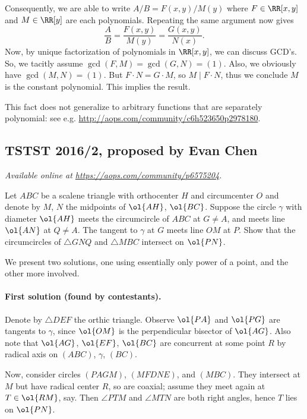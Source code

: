 \documentclass[11pt]{scrartcl}
\begin{document}
Consequently, we are able to write $A / B = F(x,y) / M(y)$
where $F \in \RR[x,y]$ and $M \in \RR[y]$ are each polynomials.
Repeating the same argument now gives
\[ \frac AB = \frac{F(x,y)}{M(y)} = \frac{G(x,y)}{N(x)}. \]
Now, by unique factorization of polynomials in $\RR[x,y]$,
we can discuss GCD's.
So, we tacitly assume $\gcd(F,M) = \gcd(G,N) = (1)$.
Also, we obviously have $\gcd(M,N) = (1)$.
But $F \cdot N = G \cdot M$, so $M \mid F \cdot N$,
thus we conclude $M$ is the constant polynomial.
This implies the result.

\begin{remark*} This fact does not generalize to arbitrary functions that are separately polynomial:
see e.g. \url{http://aops.com/community/c6h523650p2978180}. \end{remark*}
\pagebreak

\subsection{TSTST 2016/2, proposed by Evan Chen}
\textsl{Available online at \url{https://aops.com/community/p6575204}.}
\begin{mdframed}[style=mdpurplebox,frametitle={Problem statement}]
Let $ABC$ be a scalene triangle with orthocenter $H$ and circumcenter $O$
and denote by $M$, $N$ the midpoints of $\ol{AH}$, $\ol{BC}$.
Suppose the circle $\gamma$ with diameter $\ol{AH}$ meets
the circumcircle of $ABC$ at $G \neq A$,
and meets line $\ol{AN}$ at $Q \neq A$.
The tangent to $\gamma$ at $G$ meets line $OM$ at $P$.
Show that the circumcircles of $\triangle GNQ$
and $\triangle MBC$ intersect on $\ol{PN}$.
\end{mdframed}
We present two solutions,
one using essentially only power of a point,
and the other more involved.

\paragraph{First solution (found by contestants).}
Denote by $\triangle DEF$ the orthic triangle.
Observe $\ol{PA}$ and $\ol{PG}$ are tangents to $\gamma$,
since $\ol{OM}$ is the perpendicular bisector of $\ol{AG}$.
Also note that $\ol{AG}$, $\ol{EF}$, $\ol{BC}$ are concurrent at some point $R$
by radical axis on $(ABC)$, $\gamma$, $(BC)$.

Now, consider circles $(PAGM)$, $(MFDNE)$, and $(MBC)$.
They intersect at $M$ but have radical center $R$, so are coaxial;
assume they meet again at $T \in \ol{RM}$, say.
Then $\angle PTM$ and $\angle MTN$ are both right angles, hence $T$ lies on $\ol{PN}$.
\end{document}
